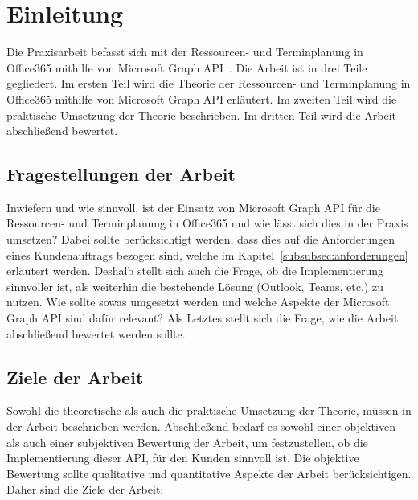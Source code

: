 


\section{Einleitung}\label{sec:einleitung}
Die Praxisarbeit befasst sich mit der Ressourcen- und Terminplanung in Office365 mithilfe von Microsoft Graph API~\cite{microsoftGraphApi}.
Die Arbeit ist in drei Teile gegliedert.
Im ersten Teil wird die Theorie der Ressourcen- und Terminplanung in Office365 mithilfe von Microsoft Graph API erläutert.
Im zweiten Teil wird die praktische Umsetzung der Theorie beschrieben.
Im dritten Teil wird die Arbeit abschließend bewertet.
    \newline
    \subsection{Fragestellungen der Arbeit}\label{subsec:fragestellungen-der-arbeit}
Inwiefern und wie sinnvoll, ist der Einsatz von Microsoft Graph API für die Ressourcen- und Terminplanung in Office365 und wie lässt sich dies in der Praxis umsetzen?
Dabei sollte berücksichtigt werden, dass dies auf die Anforderungen eines Kundenauftrags bezogen sind, welche im Kapitel~\ref{subsubsec:anforderungen} erläutert werden.
Deshalb stellt sich auch die Frage, ob die Implementierung sinnvoller ist, als weiterhin die bestehende Lösung (Outlook, Teams, etc.) zu nutzen.
Wie sollte sowas umgesetzt werden und welche Aspekte der Microsoft Graph API sind dafür relevant?
Als Letztes stellt sich die Frage, wie die Arbeit abschließend bewertet werden sollte.

\subsection{Ziele der Arbeit}\label{subsec:ziele-der-arbeit}
Sowohl die theoretische als auch die praktische Umsetzung der Theorie, müssen in der Arbeit beschrieben werden.
Abschließend bedarf es sowohl einer objektiven als auch einer subjektiven Bewertung der Arbeit, um festzustellen, ob die Implementierung dieser API, für den Kunden sinnvoll ist.
Die objektive Bewertung sollte qualitative und quantitative Aspekte der Arbeit berücksichtigen.
Daher sind die Ziele der Arbeit:

